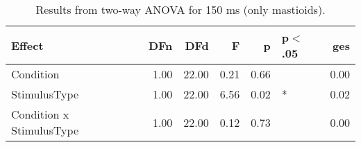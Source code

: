 \begin{table}[ht]
\centering
\begin{tabulary}{\textwidth}{lrrrrlr}
  \toprule
Effect & DFn & DFd & F & p & p$<$.05 & ges \\ 
  \midrule
Condition & 1.00 & 22.00 & 0.21 & 0.66 &  & 0.00 \\ 
  StimulusType & 1.00 & 22.00 & 6.56 & 0.02 & * & 0.02 \\ 
  Condition x StimulusType & 1.00 & 22.00 & 0.12 & 0.73 &  & 0.00 \\ 
   \bottomrule
\end{tabulary}
\caption{Results from two-way ANOVA for 150 ms (only mastioids).} 
\end{table}
